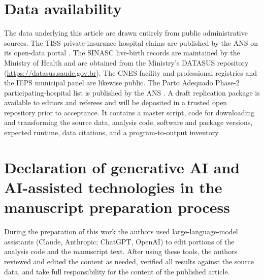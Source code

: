 \documentclass[12pt]{article}
\begin{document}
\section*{Data availability}
The data underlying this article are drawn entirely from public administrative
sources. The TISS private-insurance hospital claims are published by the ANS on
its open-data portal \citep[\url{https://dadosabertos.ans.gov.br/FTP/PDA/TISS/}]{data_ans_tiss}. The
SINASC live-birth records are maintained by the Ministry of Health
\citep{data_sinasc} and are obtained from the Ministry's DATASUS repository
(\url{https://datasus.saude.gov.br}). The CNES facility and professional registries
\citep{data_cnes} and the IEPS municipal panel \citep[\url{https://iepsdata.org.br}]{data_ieps} are likewise public.
The Parto Adequado Phase-2 participating-hospital list is published by the
ANS \citep{data_parto_adequado}.
A draft replication package is available to editors and referees and will be
deposited in a trusted open repository prior to acceptance. It contains a master
script, code for downloading and transforming the source data, analysis code,
software and package versions, expected runtime, data citations, and a
program-to-output inventory.

\section*{Declaration of generative AI and AI-assisted technologies in the
manuscript preparation process}
\begin{sloppypar}
During the preparation of this work the authors used large-language-model
assistants (Claude, Anthropic; ChatGPT, OpenAI) to edit portions of
the analysis code and the manuscript text. After using these tools, the authors
reviewed and edited the content as needed, verified all results against the
source data, and take full responsibility for the content of the published
article.
\end{sloppypar}




\appendix

\end{document}
